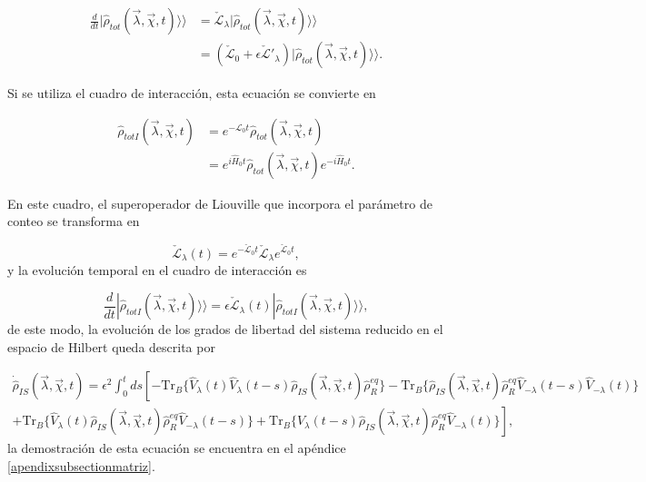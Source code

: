 \begin{align*}
    \frac{d}{dt}|\hat{\rho}_{tot}(\vec{\lambda},\vec{\chi},t)\rangle \rangle  & = \check{\mathcal{L}}_{\lambda}|\hat{\rho}_{tot}(\vec{\lambda},\vec{\chi},t)\rangle \rangle  \\  
        & = (\check{\mathcal{L}}_{0} + \epsilon \check{\mathcal{L}}'_{\lambda} )|\hat{\rho}_{tot}(\vec{\lambda},\vec{\chi},t)\rangle \rangle. 
\end{align*}

Si se utiliza el cuadro de interacción, esta ecuación se convierte en  

\begin{align*}
    \hat{\rho}_{totI}(\vec{\lambda},\vec{\chi},t) & = e^{-\mathcal{L}_{0}t}\hat{\rho}_{tot}(\vec{\lambda},\vec{\chi},t) \\
    & = e^{i\hat{H}_{0}t}\hat{\rho}_{tot}(\vec{\lambda},\vec{\chi},t)e^{-i\hat{H}_{0}t}.
\end{align*}

En este cuadro, el superoperador de Liouville que incorpora el parámetro de conteo se transforma en 

\begin{equation*}
    \check{\mathcal{L}}_{\lambda}(t) = e^{-\check{\mathcal{L}}_{0}t}\check{\mathcal{L}}_{\lambda}e^{\check{\mathcal{L}}_{0}t},
\end{equation*}
y la evolución temporal en el cuadro de interacción es 

\begin{equation}
    \frac{d}{dt}|\hat{\rho}_{totI}(\vec{\lambda},\vec{\chi},t)\rangle \rangle  = \epsilon \check{\mathcal{L}}_{\lambda}(t)|\hat{\rho}_{totI}(\vec{\lambda},\vec{\chi},t)\rangle \rangle,
 \label{sec2FCS:evolution}
\end{equation}
de este modo, la evolución de los grados de libertad del sistema reducido en el espacio de Hilbert queda descrita por 

\begin{multline}
    \dot{\hat{\rho}}_{IS}(\vec{\lambda},\vec{\chi},t) =  \epsilon^{2}\int_{0}^{t}ds \left[- \text{Tr}_{B}\{\hat{V}_{\lambda}(t)\hat{V}_{\lambda}(t-s)\hat{\rho}_{IS}(\vec{\lambda},\vec{\chi},t)\hat{\rho}^{eq}_{R} \} - \text{Tr}_{B}\{\hat{\rho}_{IS}(\vec{\lambda},\vec{\chi},t)\hat{\rho}^{eq}_{R}\hat{V}_{-\lambda}(t-s)\hat{V}_{-\lambda}(t) \} \right.\\
    \left. + \text{Tr}_{B}\{\hat{V}_{\lambda}(t)\hat{\rho}_{IS}(\vec{\lambda},\vec{\chi},t)\hat{\rho}^{eq}_{R}\hat{V}_{-\lambda}(t-s) \} + \text{Tr}_{B}\{ \hat{V}_{\lambda}(t-s)\hat{\rho}_{IS}(\vec{\lambda},\vec{\chi},t)\hat{\rho}^{eq}_{R}\hat{V}_{-\lambda}(t) \}  \right],
\label{ecmaestraVlambda}
\end{multline}
la demostración de esta ecuación se encuentra en el apéndice \ref{apendixsubsectionmatriz}.

